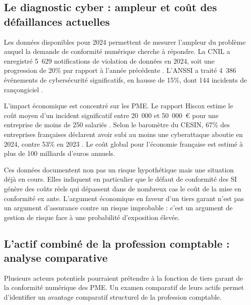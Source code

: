 \documentclass[12pt,a4paper]{article}
\begin{document}
\subsection{Le diagnostic cyber : ampleur et coût des défaillances actuelles}

Les données disponibles pour 2024 permettent de mesurer l'ampleur du problème auquel la demande de conformité numérique cherche à répondre. La CNIL a enregistré 5~629 notifications de violation de données en 2024, soit une progression de 20\% par rapport à l'année précédente \parencite{cnil2024}. L'ANSSI a traité 4~386 événements de cybersécurité significatifs, en hausse de 15\%, dont 144 incidents de rançongiciel \parencite{anssi2025}.

L'impact économique est concentré sur les PME. Le rapport Hiscox estime le coût moyen d'un incident significatif entre 20~000 et 50~000~€ pour une entreprise de moins de 250 salariés \parencite{hiscox2024}. Selon le baromètre du CESIN, 67\% des entreprises françaises déclarent avoir subi au moins une cyberattaque aboutie en 2024, contre 53\% en 2023 \parencite{cesin2025}. Le coût global pour l'économie française est estimé à plus de 100 milliards d'euros annuels.

Ces données documentent non pas un risque hypothétique mais une situation déjà en cours. Elles indiquent en particulier que le défaut de conformité des SI génère des coûts réels qui dépassent dans de nombreux cas le coût de la mise en conformité ex ante. L'argument économique en faveur d'un tiers garant n'est pas un argument d'assurance contre un risque improbable : c'est un argument de gestion de risque face à une probabilité d'exposition élevée.

\subsection{L'actif combiné de la profession comptable : analyse comparative}

Plusieurs acteurs potentiels pourraient prétendre à la fonction de tiers garant de la conformité numérique des PME. Un examen comparatif de leurs actifs permet d'identifier un avantage comparatif structurel de la profession comptable.
\end{document}
